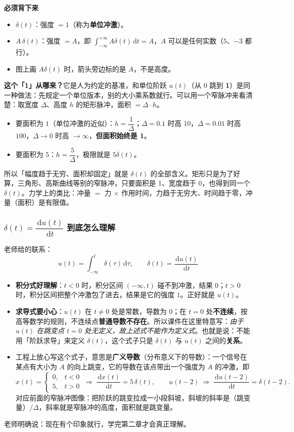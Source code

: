 \documentclass[UTF8,a4paper,11pt]{ctexart}
\newenvironment{remember}{\begin{rememberbox}\textbf{必须背下来}\par\smallskip}{\end{rememberbox}}
\renewcommand{\d}{\,\mathrm{d}}
\begin{document}
\begin{remember}
\begin{itemize}[nosep]
\item $\delta(t)$：强度 $=1$（称为\textbf{单位冲激}）。
\item $A\,\delta(t)$：强度 $=A$，即 $\int_{-\infty}^{+\infty}A\delta(t)\d t=A$，$A$ 可以是任何实数（$5$、$-3$ 都行）。
\item 图上画 $A\delta(t)$ 时，箭头旁边标的是 $A$，不是高度。
\end{itemize}
\end{remember}

\textbf{这个「1」从哪来？}它是人为约定的基准，和单位阶跃 $u(t)$（从 $0$ 跳到 \textbf{1}）是同一种做法：先规定一个单位版本，别的大小乘系数就行。可以用一个窄脉冲来看清楚：取宽度 $\Delta$、高度 $h$ 的矩形脉冲，面积 $=\Delta\cdot h$。
\begin{itemize}[nosep]
\item 要面积为 $1$（单位冲激的近似）：$h=\dfrac{1}{\Delta}$；$\Delta=0.1$ 时高 $10$，$\Delta=0.01$ 时高 $100$，$\Delta\to0$ 时高 $\to\infty$，\textbf{但面积始终是 1}。
\item 要面积为 $5$：$h=\dfrac{5}{\Delta}$，极限就是 $5\delta(t)$。
\end{itemize}
所以「幅度趋于无穷、面积却固定」就是 $\delta(t)$ 的全部含义。矩形只是为了好算，三角形、高斯曲线等别的窄脉冲，只要面积是 1、宽度趋于 0，也得到同一个 $\delta(t)$。力学上的类比：冲量 $=$ 力 $\times$ 作用时间，力趋于无穷大、时间趋于零，冲量（面积）是有限值。

\subsubsection*{$\delta(t)=\dfrac{\d u(t)}{\d t}$ 到底怎么理解}
老师给的联系：
\[
u(t)=\int_{-\infty}^{t}\delta(\tau)\d\tau,\qquad \delta(t)=\frac{\d u(t)}{\d t}
\]
\begin{itemize}[nosep]
\item \textbf{积分式好理解}：$t<0$ 时，积分区间 $(-\infty,t)$ 碰不到冲激，结果 $0$；$t>0$ 时，积分区间把整个冲激包了进去，结果是它的强度 $1$。正好就是 $u(t)$。
\item \textbf{求导式要小心}：$u(t)$ 在 $t\neq0$ 处是常数，导数为 $0$；在 $t=0$ 处\textbf{不连续}，按高等数学的规则，不连续点\textbf{普通导数不存在}。所以课件在这里特意写：\emph{由于 $u(t)$ 在跳变点 $t=0$ 处无定义，故上述式不能作为定义式}。也就是说：不能用「阶跃求导」来定义 $\delta(t)$，这个式子只是 $\delta(t)$ 与 $u(t)$ 之间的\textbf{关系}。
\item 工程上放心写这个式子，意思是\textbf{广义导数}（分布意义下的导数）：一个信号在某点有大小为 $A$ 的向上跳变，它的导数在该点带出一个强度为 $A$ 的冲激，即
\[
x(t)=\begin{cases}0,&t<0\\5,&t>0\end{cases}\ \Longrightarrow\ \frac{\d x(t)}{\d t}=5\,\delta(t),\qquad
u(t-2)\ \Longrightarrow\ \frac{\d u(t-2)}{\d t}=\delta(t-2).
\]
对应前面的窄脉冲图像：把阶跃的跳变拉成一小段斜坡，斜坡的斜率是（跳变量）$/\Delta$，斜率就是窄脉冲的高度，面积就是跳变量。
\end{itemize}
老师明确说：现在有个印象就行，学完第二章才会真正理解。
\end{document}
